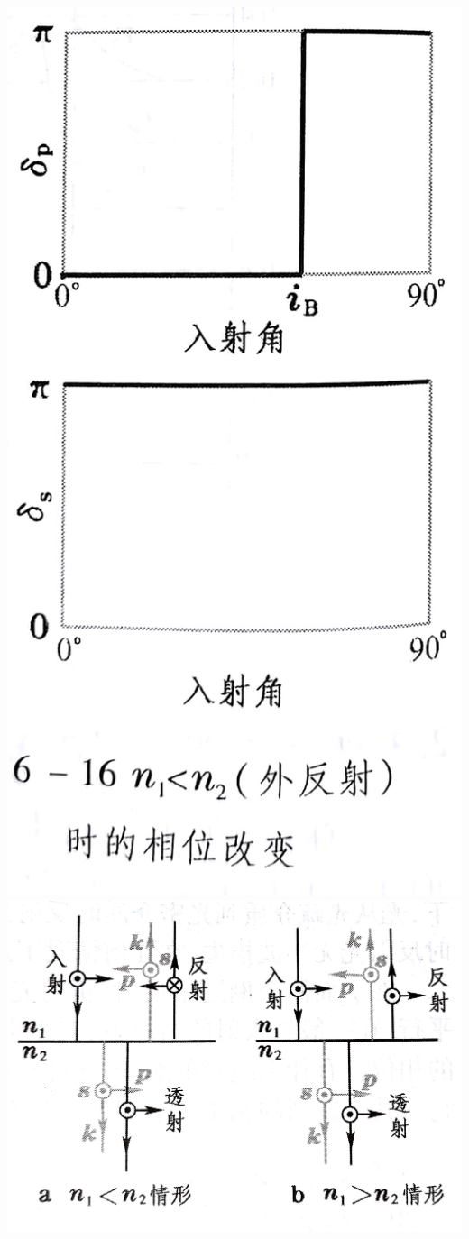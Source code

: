 \documentclass[UTF8,8pt]{ctexart}
\begin{document}
\begin{multicols}{3}
\begin{itemize}
\includegraphics[scale=0.08]{12.jpg}
\includegraphics[scale=0.07]{13.jpg}

\end{itemize}
\end{multicols}
\end{document}
